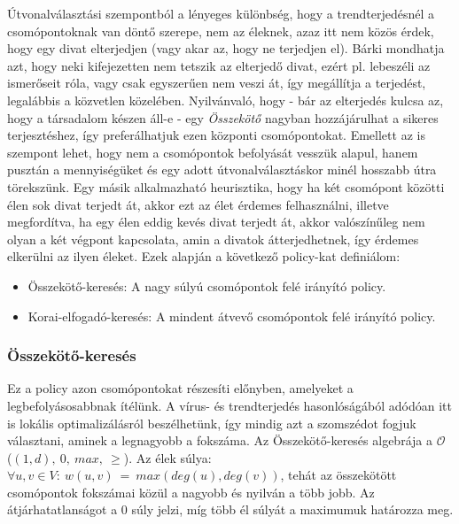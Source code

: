     Útvonalválasztási szempontból a lényeges különbség, hogy a trendterjedésnél a csomópontoknak van döntő szerepe, nem az éleknek, azaz itt nem közös érdek, hogy egy divat elterjedjen (vagy akar az, hogy ne terjedjen el). Bárki mondhatja azt, hogy neki kifejezetten nem tetszik az elterjedő divat, ezért pl. lebeszéli az ismerőseit róla, vagy csak egyszerűen nem veszi át, így megállítja a terjedést, legalábbis a közvetlen közelében. Nyilvánvaló, hogy - bár az elterjedés kulcsa az, hogy a társadalom készen áll-e - egy \emph{Összekötő} nagyban hozzájárulhat a sikeres terjesztéshez, így preferálhatjuk ezen központi csomópontokat. Emellett az is szempont lehet, hogy nem a csomópontok befolyását vesszük alapul, hanem pusztán a mennyiségüket és egy adott útvonalválasztáskor minél hosszabb útra törekszünk. Egy másik alkalmazható heurisztika, hogy ha két csomópont közötti élen sok divat terjedt át, akkor ezt az élet érdemes felhasználni, illetve megfordítva, ha egy élen eddig kevés divat terjedt át, akkor valószínűleg nem olyan a két végpont kapcsolata, amin a divatok átterjedhetnek, így érdemes elkerülni az ilyen éleket. Ezek alapján a következő policy-kat definiálom:

    \begin{itemize}
      \item Összekötő-keresés: A nagy súlyú csomópontok felé irányító policy.
      \item Korai-elfogadó-keresés: A mindent átvevő csomópontok felé irányító policy.
    \end{itemize}

      \subsubsection{Összekötő-keresés}\label{osszekoto_kereses}

      Ez a policy azon csomópontokat részesíti előnyben, amelyeket a legbefolyásosabbnak ítélünk. A vírus- és trendterjedés hasonlóságából adódóan itt is lokális optimalizálásról beszélhetünk, így mindig azt a szomszédot fogjuk választani, aminek a legnagyobb a fokszáma. Az Összekötő-keresés algebrája a $\mathcal{O}$ ($(1,d),~0,~max,~\geq$). Az élek súlya:
      $\forall u,v \in V:~w(u,v)~=~max(deg(u),deg(v))$, tehát az összekötött csomópontok fokszámai közül a nagyobb és nyilván a több jobb. Az átjárhatatlanságot a 0 súly jelzi, míg több él súlyát a maximumuk határozza meg.

